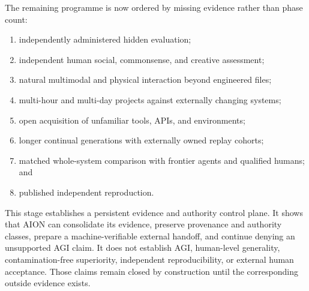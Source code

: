 The remaining programme is now ordered by missing evidence rather than phase
count:
\begin{enumerate}
  \item independently administered hidden evaluation;
  \item independent human social, commonsense, and creative assessment;
  \item natural multimodal and physical interaction beyond engineered files;
  \item multi-hour and multi-day projects against externally changing systems;
  \item open acquisition of unfamiliar tools, APIs, and environments;
  \item longer continual generations with externally owned replay cohorts;
  \item matched whole-system comparison with frontier agents and qualified
        humans; and
  \item published independent reproduction.
\end{enumerate}

This stage establishes a persistent evidence and authority control plane.  It
shows that AION can consolidate its evidence, preserve provenance and authority
classes, prepare a machine-verifiable external handoff, and continue denying an
unsupported AGI claim.  It does not establish AGI, human-level generality,
contamination-free superiority, independent reproducibility, or external human
acceptance.  Those claims remain closed by construction until the corresponding
outside evidence exists.
